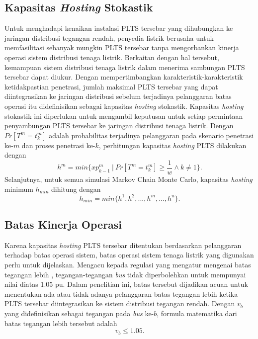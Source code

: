 \subsection{Kapasitas \textit{\textit{Hosting}} Stokastik}
Untuk menghadapi kenaikan instalasi PLTS tersebar yang dihubungkan ke jaringan distribusi tegangan rendah, penyedia listrik berusaha untuk memfasilitasi sebanyak mungkin PLTS tersebar tanpa mengorbankan kinerja operasi sistem distribusi tenaga listrik. Berkaitan dengan hal tersebut, kemampuan sistem distribusi tenaga listrik dalam menerima sambungan PLTS tersebar dapat diukur. Dengan mempertimbangkan karakteristik-karakteristik ketidakpastian penetrasi, jumlah maksimal PLTS tersebar yang dapat diintegrasikan ke jaringan distribusi sebelum terjadinya pelanggaran batas operasi itu didefinisikan sebagai kapasitas \textit{\textit{hosting}} stokastik. Kapasitas \textit{\textit{hosting}} stokastik ini diperlukan untuk mengambil keputusan untuk setiap permintaan penyambungan PLTS tersebar ke jaringan distribusi tenaga listrik. Dengan $Pr[T^m=\mathit{t^m_k}]$ adalah probabilitas terjadinya pelanggaran pada skenario penetrasi ke-$m$ dan proses penetrasi ke-$k$, perhitungan kapasitas \textit{\textit{hosting}} PLTS dilakukan dengan
\begin{equation}\label{phc1}
\mathit{h^m}=min\Big\{\mathit{xp^m_{k-\text{1}}}\ |\ Pr[T^m=\mathit{t^m_k}]\geq \frac{1}{w}\wedge k\neq 1\Big\}.
\end{equation}
Selanjutnya, untuk semua simulasi Markov Chain Monte Carlo, kapasitas \textit{\textit{hosting}} minimum $h_{min}$ dihitung dengan
\begin{equation}\label{phc2}
\mathit{h_{min}}=min\{h^1,h^2,...,h^m,...,h^u\}.
\end{equation}

\subsection{Batas Kinerja Operasi}
Karena kapasitas \textit{\textit{hosting}} PLTS tersebar ditentukan berdasarkan pelanggaran terhadap batas operasi sistem, batas operasi sistem tenaga listrik yang digunakan perlu untuk dijelaskan. Mengacu kepada regulasi yang mengatur mengenai batas tegangan lebih \cite{ANSI2011}, tegangan-tegangan \textit{bus} tidak diperbolehkan untuk mempunyai nilai diatas 1.05 pu. Dalam penelitian ini, batas tersebut dijadikan acuan untuk menentukan ada atau tidak adanya pelanggaran batas tegangan lebih ketika PLTS tersebar diintegrasikan ke sistem distribusi tegangan rendah. Dengan $v_b$ yang didefinisikan sebagai tegangan pada \textit{bus} ke-$b$, formula matematika dari batas tegangan lebih tersebut adalah
\begin{equation}
v_b \le 1.05\label{vlim}.
\end{equation}

